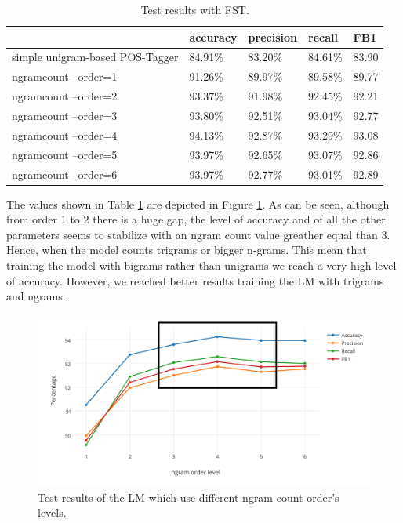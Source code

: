 \documentclass[a4paper,7pt,oneside]{book}
\begin{document}
\begin{table}[h!]
\small
	\begin{center}
	\begin{tabular}{|l|l|l|l|l|}
		\cline{2-5}
		\multicolumn{1}{r|}{} & accuracy & precision & recall & FB1 \\ \hline
		simple unigram-based POS-Tagger & 84.91\%  & 83.20\% &  84.61\% & 83.90 \\ \hline
		ngramcount --order=1 & 91.26\% & 89.97\% & 89.58\% & 89.77 \\ \hline
		ngramcount --order=2 & 93.37\% & 91.98\% & 92.45\% & 92.21 \\ \hline
		ngramcount --order=3 & 93.80\% & 92.51\% & 93.04\% & 92.77 \\ \hline \rowcolor{LightCyan}
		ngramcount --order=4 & 94.13\% & 92.87\% & 93.29\% & 93.08 \\ \hline
		ngramcount --order=5 & 93.97\% & 92.65\% & 93.07\% & 92.86 \\ \hline
		ngramcount --order=6 & 93.97\% & 92.77\% & 93.01\% & 92.89 \\ \hline
	\end{tabular}
	\caption{Test results with FST.}
	\label{table:fst_results}
	\end{center}
\end{table}

\noindent
The values shown in Table \ref{table:fst_results} are depicted in Figure \ref{fig:fst_ngram_count_levels}. As can be seen, although from order 1 to 2 there is a huge gap, the level of accuracy and of all the other parameters seems to stabilize with an ngram count value greather equal than 3. Hence, when the model counts trigrams or bigger n-grams. This mean that training the model with bigrams rather than unigrams we reach a very high level of accuracy. However, we reached better results training the LM with trigrams and ngrams.

\begin{figure}[h]
  \centering
    \includegraphics[scale=1.2]{res/fst_ngram_count_levels_small_rect}
    \caption{Test results of the LM which use different ngram count order's levels.}
    \label{fig:fst_ngram_count_levels}
\end{figure}
\end{document}
